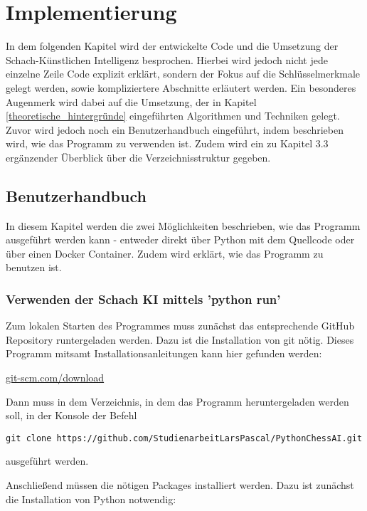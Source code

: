 
\chapter{Implementierung}
In dem folgenden Kapitel wird der entwickelte Code und die Umsetzung der Schach-Künstlichen Intelligenz besprochen. Hierbei wird jedoch nicht jede einzelne Zeile Code explizit erklärt, sondern der Fokus auf die Schlüsselmerkmale gelegt werden, sowie kompliziertere Abschnitte erläutert werden. Ein besonderes Augenmerk wird dabei auf die Umsetzung, der in Kapitel \ref{theoretische_hintergründe} eingeführten Algorithmen und Techniken gelegt. Zuvor wird jedoch noch ein Benutzerhandbuch eingeführt, indem beschrieben wird, wie das Programm zu verwenden ist. Zudem wird ein zu Kapitel 3.3 ergänzender Überblick über die Verzeichnisstruktur gegeben.

   \section{Benutzerhandbuch}\label{benutzerhandbuch}

In diesem Kapitel werden die zwei Möglichkeiten beschrieben, wie das Programm ausgeführt werden kann - entweder direkt über Python mit dem Quellcode oder über einen Docker Container. Zudem wird erklärt, wie das Programm zu benutzen ist.

\subsection{Verwenden der Schach KI mittels 'python
run'}\label{verwenden-der-schach-ki-mittels-python-run}

Zum lokalen Starten des Programmes muss zunächst das entsprechende
GitHub Repository runtergeladen werden. Dazu ist die Installation von
git nötig. Dieses Programm mitsamt Installationsanleitungen kann hier
gefunden werden:

\href{https://git-scm.com/download/}{git-scm.com/download}

Dann muss in dem Verzeichnis, in dem das Programm heruntergeladen werden
soll, in der Konsole der Befehl

\texttt{git\ clone\ https://github.com/StudienarbeitLarsPascal/PythonChessAI.git}

ausgeführt werden.

Anschließend müssen die nötigen Packages installiert werden. Dazu ist
zunächst die Installation von Python notwendig:

